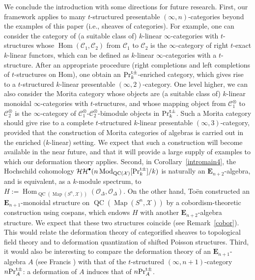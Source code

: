 \documentclass[leqno,12pt]{amsart}
\theoremstyle{plain}
\theoremstyle{definition}
\newcommand{\HH}{\operatorname{\mathcal{HH}}}
\newcommand{\CCC}{\mathcal{C}}
\newcommand{\PRTTT}{\textup{Pr}^{\textup{t}\pm}}
\newcommand{\OO}{{\mathcal{O}}}
\newcommand{\Hom}{\operatorname{Hom}}
\newcommand{\Mod}{\operatorname{Mod}}
\newcommand{\Map}{\operatorname{Map}}
\newcommand{\QC}{\operatorname{QC}}
\newcommand{\XX}{\mathcal{X}}
\begin{document}
We conclude the introduction with some directions for future research.
First, our framework applies to many $t$-structured presentable $(\infty,n)$-categories beyond the examples of this paper (i.e., sheaves of categories).
For example, 
one can consider the category of  (a suitable class of) $k$-linear $\infty$-categories with $t$-structures
whose $\Hom(\CCC_1,\CCC_2)$ from $\CCC_1$ to $\CCC_2$ is the $\infty$-category of 
right $t$-exact $k$-linear functors, which can be defined as $k$-linear $\infty$-categories with a $t$-structure.
After an appropriate procedure 
(right completions and left completions of $t$-structures on Hom), one obtain an $\PRTTT_k$-enriched category, which gives rise to
a $t$-structured $k$-linear presentable $(\infty,2)$-category.
One level higher, we can also consider the Morita category whose objects are (a suitable class of) 
$k$-linear monoidal $\infty$-categories with $t$-structures, and whose mapping object from $\mathcal{C}_1^\otimes$ to $\mathcal{C}_2^\otimes$ is the $\infty$-category of $\mathcal{C}_1^\otimes$-$\mathcal{C}_2^\otimes$-bimodule objects in $\PRTTT_k$. Such a Morita category should give rise to a complete $t$-structured $k$-linear presentable $(\infty,3)$-category, provided that the construction of Morita categories of algebras is carried out in the enriched ($k$-linear) setting. We expect that such a construction will become available in the near future, and that it will provide a large supply of examples to which our deformation theory applies.
Second, in Corollary~\ref{intromain4}, the Hochschild cohomology $\HH^\bullet(n\Mod_{\QC(\XX)}[\PRTTT_k]/k)$ is naturally an $\mathbf{E}_{n+2}$-algebra,
and is equivalent, as a $k$-module spectrum, to $H:=\Hom_{\QC(\Map(S^n,\XX))}(\OO_{\Delta},\OO_{\Delta})$.
On the other hand, To\"en \cite{Toen} constructed an $\mathbf{E}_{n+1}$-monoidal structure on $\QC(\Map(S^n,\XX))$
by a cobordism-theoretic construction using cospans, which endows $H$ with another $\mathbf{E}_{n+2}$-algebra structure.
We expect that these two structures coincide (see Remark~\ref{cobor}).
This would relate the deformation theory of categorified sheaves to topological field theory
and to deformation quantization of shifted Poisson structures.
Third, it would also be interesting to compare the deformation theory of an $\mathbf{E}_{n+1}$-algebra $A$ (see Francis \cite{FR})
with that of the $t$-structured $(\infty,n+1)$-category $n\PRTTT_A$: a deformation of $A$ induces that of $n\PRTTT_A$.
\end{document}

